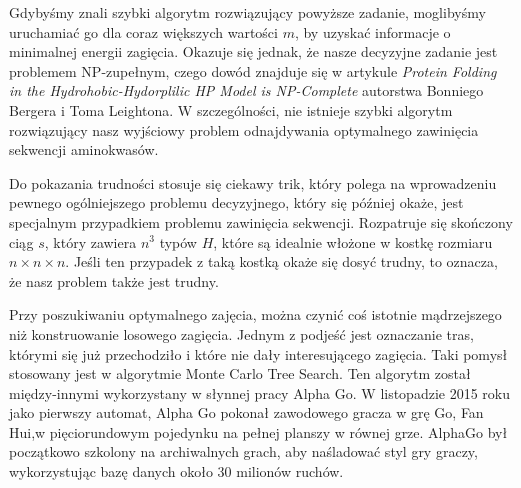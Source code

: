 \documentclass[leqno,10pt]{article}
\begin{document}
Gdybyśmy znali szybki algorytm rozwiązujący powyższe zadanie, moglibyśmy
uruchamiać go dla coraz większych wartości $m$, by uzyskać informacje o
minimalnej energii zagięcia. Okazuje się jednak, że nasze decyzyjne zadanie jest
problemem NP-zupełnym, czego dowód znajduje się w artykule \textit{Protein Folding in the Hydrohobic-Hydorplilic HP Model is
NP-Complete} autorstwa Bonniego Bergera i Toma Leightona. 
W szczególności, nie istnieje szybki algorytm rozwiązujący nasz wyjściowy
problem odnajdywania optymalnego zawinięcia sekwencji aminokwasów. 

Do pokazania trudności stosuje się ciekawy trik, który polega na wprowadzeniu
pewnego ogólniejszego problemu decyzyjnego, który się później okaże, jest
specjalnym przypadkiem problemu zawinięcia sekwencji. Rozpatruje się skończony ciąg $s$, który zawiera $n^{3}$ typów $H$, które są idealnie włożone w kostkę rozmiaru $n \times n \times n$. Jeśli ten przypadek z taką kostką okaże
się dosyć trudny, to oznacza, że nasz problem także jest trudny. 

Przy poszukiwaniu optymalnego zajęcia, można czynić coś istotnie mądrzejszego niż konstruowanie losowego zagięcia. Jednym z podjeść jest oznaczanie tras, którymi się już przechodziło i które nie dały interesującego zagięcia. Taki pomysł stosowany jest w algorytmie Monte Carlo Tree Search. Ten algorytm został między-innymi wykorzystany w słynnej pracy Alpha Go. W listopadzie 2015 roku jako pierwszy automat, Alpha Go pokonał zawodowego gracza w grę Go, Fan Hui,w pięciorundowym pojedynku na pełnej planszy w równej grze. AlphaGo był początkowo szkolony na archiwalnych grach, aby naśladować styl gry graczy, wykorzystując bazę danych około 30 milionów ruchów. 
\end{document}
